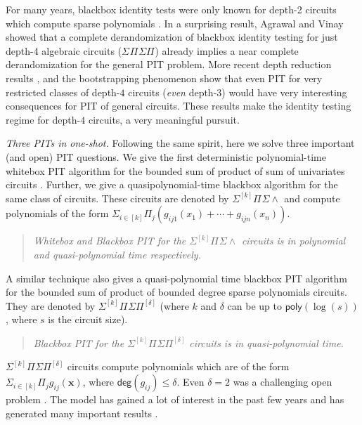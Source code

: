 \documentclass[10pt,a4paper]{article}
\newcommand{\poly}{\mathsf{poly}}
\newcommand{\x}{{\boldsymbol x}}
\newcommand{\pdeg}{\mathsf{deg}}
\newcommand{\SPSP}[3]{\Sigma^{#1}\Pi^{#2}\Sigma\Pi^{#3}}
\newcommand{\SPSU}[3]{\Sigma^{#1} \Pi^{#2} \Sigma \wedge^{#3}}
\numberwithin{equation}{section}
\begin{document}
For many years, blackbox identity tests were only known for depth-2 circuits which compute sparse polynomials \cite{ben1988deterministic,klivans2001randomness}. In a surprising result, Agrawal and Vinay \cite{agrawal2008arithmetic} showed that a complete derandomization of blackbox identity testing for just depth-4 algebraic circuits ($\SPSP{}{}{}$) already implies a near complete derandomization for the general PIT problem. More recent depth reduction results \cite{koiran2012arithmetic,gupta2013arithmetic}, and the bootstrapping phenomenon \cite{Agrawal8107,kumar2019near,DBLP:conf/focs/Guo0SS19,DBLP:conf/coco/000320} show that even PIT
for very restricted classes of depth-$4$  circuits (\emph{even} depth-$3$) would have very
interesting consequences for PIT of general circuits. These results make the identity testing regime for depth-$4$ circuits, a very meaningful pursuit.

\emph{Three PITs in one-shot.} Following the same spirit, here we solve three important (and open) PIT questions. We give the first deterministic polynomial-time whitebox PIT algorithm for the bounded sum of product of sum of univariates circuits \cite[Open Prob.~2]{saha2013case}. Further, we give a quasipolynomial-time blackbox algorithm for the same class of circuits. These circuits are denoted by $\SPSU{[k]}{}{}$ and compute polynomials of the form $\Sigma_{i \in [k]} \Pi_{j} \left(g_{ij1}(x_1)+ \cdots +g_{ijn}(x_n)\right)$.
\begin{quote}
    \itshape 
    Whitebox and Blackbox PIT for the $\SPSU{[k]}{}{}$ circuits is in polynomial and quasi-polynomial time respectively.
\end{quote}
%
A similar technique also gives a quasi-polynomial time blackbox PIT algorithm for the bounded sum of product of bounded degree sparse polynomials circuits. They are denoted by $\SPSP{[k]}{}{[\delta]}$ (where $k$ and $\delta$ can be up to \(\poly(\log(s))\), where \(s\) is the circuit size). 
\begin{quote}
    \itshape
    Blackbox PIT for the $\SPSP{[k]}{}{[\delta]}$ circuits is in quasi-polynomial time.
\end{quote}
%
$\SPSP{[k]}{}{[\delta]}$ circuits compute polynomials which are of the form $\Sigma_{i \in [k]} \Pi_{j} g_{ij}(\x)$, where $\pdeg(g_{ij}) \le \delta$. Even $\delta=2$ was a challenging open problem \cite[Open Problem~2]{DBLP:conf/coco/0001S16a}. The model has gained a lot of interest in the past few years and has generated many important results \cite{peleg2020generalized,peleg2020polynomial,GOS22,OS22}.
\end{document}
